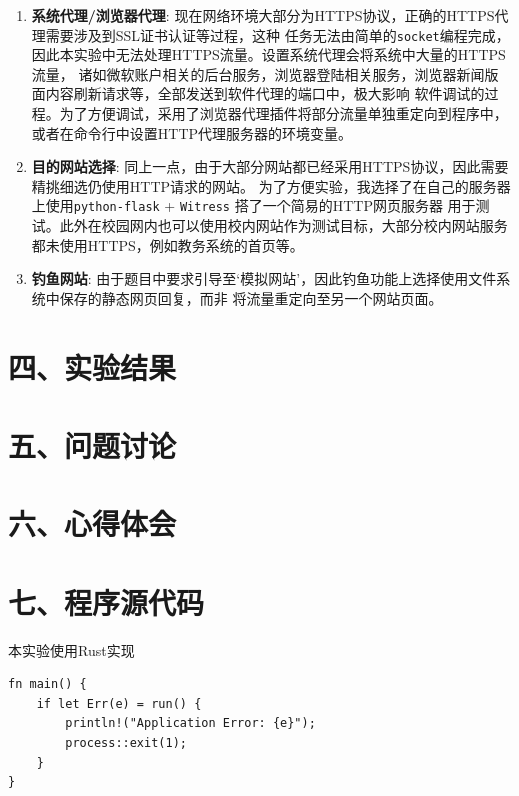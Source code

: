 \documentclass{ctexart}
\begin{document}
\begin{enumerate}
    \item \textbf{系统代理/浏览器代理}: 现在网络环境大部分为HTTPS协议，正确的HTTPS代理需要涉及到SSL证书认证等过程，这种
    任务无法由简单的\texttt{socket}编程完成，因此本实验中无法处理HTTPS流量。设置系统代理会将系统中大量的HTTPS流量，
    诸如微软账户相关的后台服务，浏览器登陆相关服务，浏览器新闻版面内容刷新请求等，全部发送到软件代理的端口中，极大影响
    软件调试的过程。为了方便调试，采用了浏览器代理插件将部分流量单独重定向到程序中，或者在命令行中设置HTTP代理服务器的环境变量。
    \item \textbf{目的网站选择}: 同上一点，由于大部分网站都已经采用HTTPS协议，因此需要精挑细选仍使用HTTP请求的网站。
    为了方便实验，我选择了在自己的服务器上使用\texttt{python-flask} + \texttt{Witress} 搭了一个简易的HTTP网页服务器
    用于测试。此外在校园网内也可以使用校内网站作为测试目标，大部分校内网站服务都未使用HTTPS，例如教务系统的首页等。
    \item \textbf{钓鱼网站}: 由于题目中要求引导至`模拟网站'，因此钓鱼功能上选择使用文件系统中保存的静态网页回复，而非
    将流量重定向至另一个网站页面。
\end{enumerate}


\section*{四、实验结果}

\section*{五、问题讨论}

\section*{六、心得体会}

\section*{七、程序源代码}

本实验使用Rust实现

\begin{verbatim}
fn main() {
    if let Err(e) = run() {
        println!("Application Error: {e}");
        process::exit(1);
    }
}
\end{verbatim}
\end{document}
